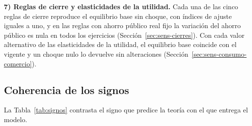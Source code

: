 \documentclass[11pt]{article}
\begin{document}
\textbf{7) Reglas de cierre y elasticidades de la utilidad.} Cada una de las cinco reglas de cierre reproduce el equilibrio base sin choque, con índices de ajuste iguales a uno, y en las reglas con ahorro público real fijo la variación del ahorro público es nula en todos los ejercicios (Sección~\ref{sec:sens-cierres}). Con cada valor alternativo de las elasticidades de la utilidad, el equilibrio base coincide con el vigente y un choque nulo lo devuelve sin alteraciones (Sección~\ref{sec:sens-consumo-comercio}).

\subsection{Coherencia de los signos}

La Tabla~\ref{tab:signos} contrasta el signo que predice la teoría con el que entrega el modelo.

\begin{table}[H]
\centering
\caption{Signo esperado y signo obtenido, por variable y simulación}
\label{tab:signos}
\small
{}
\end{table}
\end{document}
